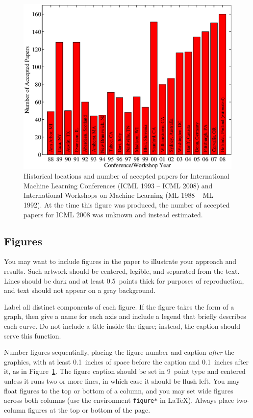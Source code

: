 \documentclass{article}
\begin{document}
\begin{figure}[ht]
  \vskip 0.2in
  \begin{center}
    \centerline{\includegraphics[width=\columnwidth]{icml_numpapers}}
    \caption{Historical locations and number of accepted papers for International
      Machine Learning Conferences (ICML 1993 -- ICML 2008) and International
      Workshops on Machine Learning (ML 1988 -- ML 1992). At the time this figure was
      produced, the number of accepted papers for ICML 2008 was unknown and instead
    estimated.}
    \label{icml-historical}
  \end{center}
  \vskip -0.2in
\end{figure}

\subsection{Figures}

You may want to include figures in the paper to illustrate
your approach and results. Such artwork should be centered,
legible, and separated from the text. Lines should be dark and at
least 0.5~points thick for purposes of reproduction, and text should
not appear on a gray background.

Label all distinct components of each figure. If the figure takes the
form of a graph, then give a name for each axis and include a legend
that briefly describes each curve. Do not include a title inside the
figure; instead, the caption should serve this function.

Number figures sequentially, placing the figure number and caption
\emph{after} the graphics, with at least 0.1~inches of space before
the caption and 0.1~inches after it, as in
Figure~\ref{icml-historical}. The figure caption should be set in
9~point type and centered unless it runs two or more lines, in which
case it should be flush left. You may float figures to the top or
bottom of a column, and you may set wide figures across both columns
(use the environment \texttt{figure*} in \LaTeX). Always place
two-column figures at the top or bottom of the page.
\end{document}

